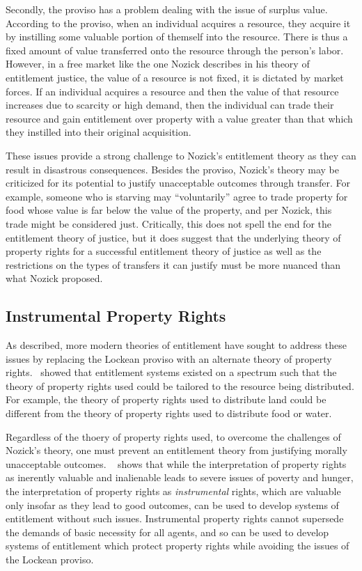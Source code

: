 Secondly, the proviso has a problem dealing with the issue of surplus value. 
According to the proviso, when an individual acquires a resource, they acquire
it by instilling some valuable portion of themself into the resource. There is
thus a fixed amount of value transferred onto the resource through the person's
labor. However, in a free market like the one Nozick describes in his 
theory of entitlement justice, the value of a resource is not fixed, it is
dictated by market forces. If an individual acquires a resource and then the 
value of that resource increases due to scarcity or high demand, then the
individual can trade their resource and gain entitlement over property with a 
value greater than that which they instilled into their original acquisition.

These issues provide a strong challenge to Nozick's entitlement theory as they
can result in disastrous consequences. Besides the proviso, Nozick's theory may
be criticized for its potential to justify unacceptable outcomes through
transfer. For example, someone who is starving may ``voluntarily'' agree to
trade property for food whose value is far below the value of the property, and
per Nozick, this trade might be considered just.  Critically, this does not
spell the end for the entitlement theory of justice, but it does suggest that
the underlying theory of property rights for a successful entitlement theory of
justice as well as the restrictions on the types of transfers it can justify
must be more nuanced than what Nozick proposed.

\subsection{Instrumental Property Rights}

As described, more modern theories of entitlement have sought to address these
issues by replacing the Lockean proviso with an alternate theory of property
rights.~\cite{Van_der_Veen_1985} showed that entitlement systems existed on a 
spectrum such that the theory of property rights used could be tailored to the
resource being distributed. For example, the theory of property rights used to
distribute land could be different from the theory of property rights used to
distribute food or water.

Regardless of the thoery of property rights used, to overcome the challenges of
Nozick's theory, one must prevent an entitlement theory from justifying morally
unacceptable outcomes. ~\cite{Sen_1988} shows that while the interpretation of
property rights as inerently valuable and inalienable leads to severe issues of
poverty and hunger, the interpretation of property rights as
\textit{instrumental} rights, which are valuable only insofar as they lead to
good outcomes, can be used to develop systems of entitlement without such
issues. Instrumental property rights cannot supersede the demands of basic
necessity for all agents, and so can be used to develop systems of entitlement
which protect property rights while avoiding the issues of the Lockean proviso.

